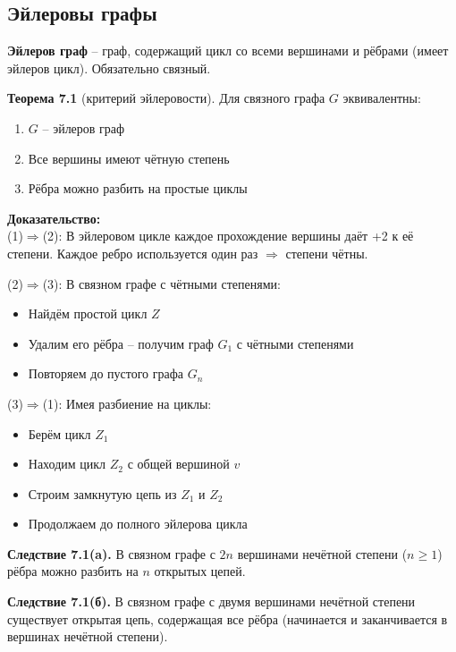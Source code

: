 \subsection{Эйлеровы графы}

\noindent\textbf{Эйлеров граф} -- граф, содержащий цикл со всеми вершинами и рёбрами (имеет эйлеров цикл). Обязательно связный.

\noindent\textbf{Теорема 7.1} (критерий эйлеровости). Для связного графа $G$ эквивалентны:
\begin{enumerate}[noitemsep,topsep=0pt]
\item $G$ -- эйлеров граф
\item Все вершины имеют чётную степень
\item Рёбра можно разбить на простые циклы
\end{enumerate}

\noindent\textbf{Доказательство:}\\
(1)$\Rightarrow$(2): В эйлеровом цикле каждое прохождение вершины даёт +2 к её степени. Каждое ребро используется один раз $\Rightarrow$ степени чётны.

\noindent(2)$\Rightarrow$(3): В связном графе с чётными степенями:
\begin{itemize}[noitemsep]
\item Найдём простой цикл $Z$
\item Удалим его рёбра -- получим граф $G_1$ с чётными степенями
\item Повторяем до пустого графа $G_n$
\end{itemize}

\noindent(3)$\Rightarrow$(1): Имея разбиение на циклы:
\begin{itemize}[noitemsep]
\item Берём цикл $Z_1$
\item Находим цикл $Z_2$ с общей вершиной $v$
\item Строим замкнутую цепь из $Z_1$ и $Z_2$
\item Продолжаем до полного эйлерова цикла
\end{itemize}

\noindent\textbf{Следствие 7.1(a).} В связном графе с $2n$ вершинами нечётной степени ($n \geq 1$) рёбра можно разбить на $n$ открытых цепей.

\noindent\textbf{Следствие 7.1(б).} В связном графе с двумя вершинами нечётной степени существует открытая цепь, содержащая все рёбра (начинается и заканчивается в вершинах нечётной степени).